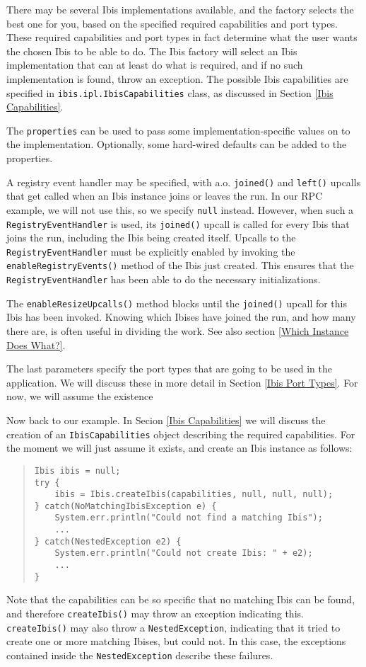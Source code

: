 \documentclass[10pt]{article}
\begin{document}
There may be several Ibis implementations available, and
the factory selects the best one for you, based on the
specified required capabilities and port types.
These required capabilities and port types in fact determine what
the user wants the chosen Ibis to be able to do.
The Ibis factory will select an Ibis implementation that can at least
do what is required, and if no such implementation is found, throw an exception.
The possible Ibis capabilities are specified in
\texttt{ibis.ipl.IbisCapabilities} class, as discussed in Section
\ref{Ibis Capabilities}.

The \texttt{properties} can be used to pass some implementation-specific
values on to the implementation.  Optionally, some hard-wired defaults
can be added to the properties.

A registry event handler may be specified,
with a.o. \texttt{joined()} and \texttt{left()} upcalls that get
called when an Ibis instance joins or leaves the run.
In our RPC example, we will not use this, so we
specify \texttt{null} instead.
However, when such a \texttt{RegistryEventHandler}
is used, its \texttt{joined()} upcall is called for every Ibis that joins the
run, including the Ibis being created itself.
Upcalls to the \texttt{RegistryEventHandler} must be explicitly enabled by
invoking the \texttt{enableRegistryEvents()} method of the Ibis
just created. This ensures that the \texttt{RegistryEventHandler} has been
able to do the necessary initializations.

The \texttt{enableResizeUpcalls()} method blocks until the
\texttt{joined()} upcall for this Ibis has been invoked.  Knowing which Ibises
have joined the run, and how many there are, is often useful in dividing
the work. See also section \ref{Which Instance Does What?}.

The last parameters specify the port types that are going to be used
in the application. We will discuss these in more detail in Section
\ref{Ibis Port Types}. For now, we will assume the existence

Now back to our example. In Secion \ref{Ibis Capabilities} we will
discuss the creation of an \texttt{IbisCapabilities} object describing the
required capabilities. For the moment we will just assume it
exists, and create an Ibis instance as follows:
{\small
\begin{quote}
\begin{verbatim}
Ibis ibis = null;
try {
    ibis = Ibis.createIbis(capabilities, null, null, null);
} catch(NoMatchingIbisException e) {
    System.err.println("Could not find a matching Ibis");
    ...
} catch(NestedException e2) {
    System.err.println("Could not create Ibis: " + e2);
    ...
}
\end{verbatim}
\end{quote}
}
Note that the capabilities can be so specific that no matching Ibis
can be found, and therefore \texttt{createIbis()} may throw an exception
indicating this.
\texttt{createIbis()} may also throw a \texttt{NestedException}, indicating
that it tried to create one or more matching Ibises, but could not.
In this case, the exceptions contained inside the \texttt{NestedException}
describe these failures.
\end{document}
